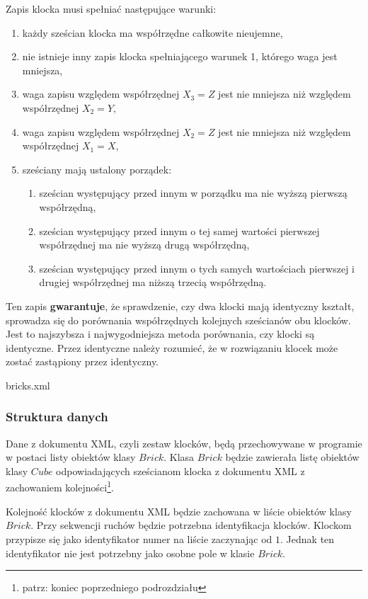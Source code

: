 \documentclass[12pt]{article}
\begin{document}
Zapis klocka musi spełniać następujące warunki:
\begin{enumerate}
	\item każdy sześcian klocka ma współrzędne całkowite nieujemne,
	\item nie istnieje inny zapis klocka spełniającego warunek 1, którego
		waga jest mniejsza,
	\item waga zapisu względem współrzędnej $X_3=Z$ jest nie mniejsza niż 
		względem współrzędnej $X_2=Y$,
	\item waga zapisu względem współrzędnej $X_2=Z$ jest nie mniejsza niż 
		względem współrzędnej $X_1=X$,
	\item sześciany mają ustalony porządek:
		\begin{enumerate}
			\item sześcian występujący przed innym w porządku ma nie wyższą
				pierwszą współrzędną,
			\item sześcian występujący przed innym o tej samej wartości
				pierwszej współrzędnej ma nie wyższą drugą współrzędną,
			\item sześcian występujący przed innym o tych samych wartościach
				pierwszej i drugiej współrzędnej ma niższą trzecią współrzędną.
		\end{enumerate}
\end{enumerate}
Ten zapis \textbf{gwarantuje}, że sprawdzenie, czy dwa klocki mają
identyczny kształt, sprowadza się do porównania współrzędnych kolejnych
sześcianów obu klocków. Jest to najszybsza i najwygodniejsza metoda
porównania, czy klocki są identyczne. Przez identyczne należy rozumieć,
że w rozwiązaniu klocek może zostać zastąpiony przez identyczny.


{bricks.xml}

\subsubsection{Struktura danych}
Dane z dokumentu XML, czyli zestaw klocków, będą przechowywane w programie
w postaci listy obiektów klasy $Brick$. Klasa $Brick$ będzie zawierała
listę obiektów klasy $Cube$ odpowiadających sześcianom klocka z dokumentu
XML z zachowaniem kolejności\footnote{patrz: koniec poprzedniego
podrozdziału}.

Kolejność klocków z dokumentu XML będzie zachowana w liście obiektów klasy
$Brick$. Przy sekwencji ruchów będzie potrzebna identyfikacja klocków.
Klockom przypisze się jako identyfikator numer na liście zaczynając od $1$.
Jednak ten identyfikator nie jest potrzebny jako osobne pole w klasie
$Brick$.
\end{document}
